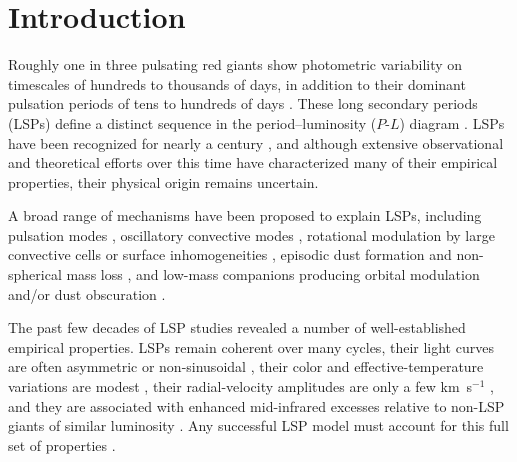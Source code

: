 \documentclass[trackchanges,twocolumn]{aastex631}
\begin{document}
\section{Introduction}\label{sec:introduction}


Roughly one in three pulsating red giants show photometric variability on timescales of hundreds to thousands of days, in addition to their dominant pulsation periods of tens to hundreds of days \citep[e.g.,][]{Wood99,Wood04, Soszynski04,Soszynski07,Fraser08,Nicholls09,Pawlak21,Pawlak24}.  
These long secondary periods (LSPs) define a distinct sequence in the period--luminosity ($P$-$L$) diagram \citep[sequence~D;][]{Wood99}.
LSPs have been recognized for nearly a century \citep{OConnell33,PayneGaposchkin54,Houk63}, and although extensive observational and theoretical efforts over this time have characterized many of their empirical properties, their physical origin remains uncertain.

A broad range of mechanisms have been proposed to explain LSPs, including pulsation modes \citep{Wood00,Wood04,Nicholls09,Saio23}, oscillatory convective modes \citep{Saio15,Takayama15,Takayama20,CourtneyBarrer26}, rotational modulation by large convective cells or surface inhomogeneities \citep{Stothers10,Soszynski14}, episodic dust formation and non-spherical mass loss \citep{Wood09,Pawlak21}, and low-mass companions producing orbital modulation and/or dust obscuration \citep{Wood99,Derekas06,Soszynski07,Soszynski21,Goldberg24,Decin25}.

The past few decades of LSP studies revealed a number of well-established empirical properties. LSPs remain coherent over many cycles, their light curves are often asymmetric or non-sinusoidal \citep[e.g.,][]{Soszynski14}, their color and effective-temperature variations are modest \citep{Nicholls09,Takayama20}, their radial-velocity amplitudes are only a few km~s$^{-1}$ \citep{Nicholls09}, and they are associated with enhanced mid-infrared excesses relative to non-LSP giants of similar luminosity \citep{Wood09,Pawlak21}. Any successful LSP model must account for this full set of properties \citep[see][for a comprehensive list]{Goldberg24}.
\end{document}
